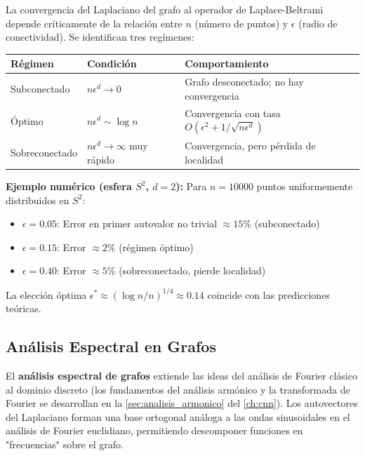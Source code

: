 \begin{remark}\label{rem:tasas_convergencia_laplaciano}
	La convergencia del Laplaciano del grafo al operador de Laplace-Beltrami depende críticamente de la relación entre $n$ (número de puntos) y $\epsilon$ (radio de conectividad). Se identifican tres regímenes:

	\begin{center}
	\small
	\begin{tabular}{@{}llp{5cm}@{}}
		\toprule
		\textbf{Régimen} & \textbf{Condición} & \textbf{Comportamiento} \\
		\midrule
		Subconectado & $n\epsilon^d \to 0$ & Grafo desconectado; no hay convergencia \\
		\addlinespace
		Óptimo & $n\epsilon^d \sim \log n$ & Convergencia con tasa $O(\epsilon^2 + 1/\sqrt{n\epsilon^d})$ \\
		\addlinespace
		Sobreconectado & $n\epsilon^d \to \infty$ muy rápido & Convergencia, pero pérdida de localidad \\
		\bottomrule
	\end{tabular}
	\end{center}

	\textbf{Ejemplo numérico (esfera $S^2$, $d=2$):} Para $n = 10000$ puntos uniformemente distribuidos en $S^2$:
	\begin{itemize}
		\item $\epsilon = 0.05$: Error en primer autovalor no trivial $\approx 15\%$ (subconectado)
		\item $\epsilon = 0.15$: Error $\approx 2\%$ (régimen óptimo)
		\item $\epsilon = 0.40$: Error $\approx 5\%$ (sobreconectado, pierde localidad)
	\end{itemize}
	La elección óptima $\epsilon^* \approx (\log n / n)^{1/4} \approx 0.14$ coincide con las predicciones teóricas.
\end{remark}

\subsection{Análisis Espectral en Grafos}\label{subsec:analisis_espectral_grafos_gdl}

El \textbf{análisis espectral de grafos} extiende las ideas del análisis de Fourier clásico al dominio discreto (los fundamentos del análisis armónico y la transformada de Fourier se desarrollan en la \autoref{sec:analisis_armonico} del \autoref{ch:cnn}). Los autovectores del Laplaciano forman una base ortogonal análoga a las ondas sinusoidales en el análisis de Fourier euclidiano, permitiendo descomponer funciones en "frecuencias" sobre el grafo.

